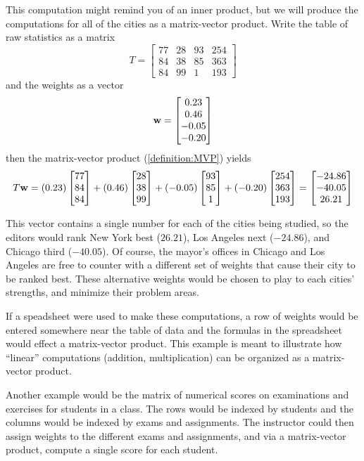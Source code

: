 \documentclass{ximera}
\begin{document}
\begin{example}
  This computation might remind you of an inner product, but we will
  produce the computations for all of the cities as a matrix-vector
  product.  Write the table of raw statistics as a matrix
  \[
    T=
    \begin{bmatrix}
      77 & 28 & 93 & 254\\
      84 & 38 & 85 & 363\\
      84 & 99 & 1 & 193
    \end{bmatrix}
  \]
  and the weights as a vector
  \[
    \mathbf{w}=\begin{bmatrix}0.23\\0.46\\-0.05\\-0.20\end{bmatrix}
  \]
  then the matrix-vector product (\ref{definition:MVP}) yields
  \[
    T\mathbf{w}=
    (0.23)\begin{bmatrix}77\\84\\84\end{bmatrix}+
    (0.46)\begin{bmatrix}28\\38\\99\end{bmatrix}+
    (-0.05)\begin{bmatrix}93\\85\\1\end{bmatrix}+
    (-0.20)\begin{bmatrix}254\\363\\193\end{bmatrix}
    =
    \begin{bmatrix}-24.86\\-40.05\\26.21\end{bmatrix}
  \]

  This vector contains a single number for each of the cities being
  studied, so the editors would rank New York best ($26.21$), Los
  Angeles next ($-24.86$), and Chicago third ($-40.05$).  Of course,
  the mayor's offices in Chicago and Los Angeles are free to counter
  with a different set of weights that cause their city to be ranked
  best.  These alternative weights would be chosen to play to each
  cities' strengths, and minimize their problem areas.

  If a speadsheet were used to make these computations, a row of
  weights would be entered somewhere near the table of data and the
  formulas in the spreadsheet would effect a matrix-vector product.
  This example is meant to illustrate how ``linear'' computations
  (addition, multiplication) can be organized as a matrix-vector
  product.

  Another example would be the matrix of numerical scores on
  examinations and exercises for students in a class.  The rows would
  be indexed by students and the columns would be indexed by exams and
  assignments.  The instructor could then assign weights to the
  different exams and assignments, and via a matrix-vector product,
  compute a single score for each student.

\end{example}
\end{document}
